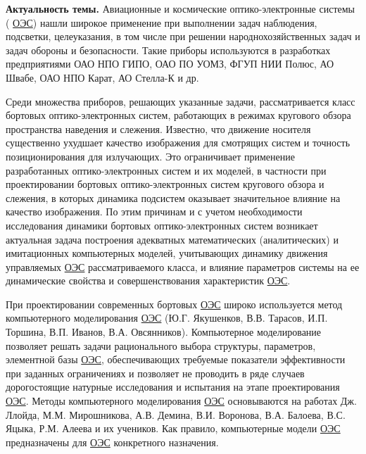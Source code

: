 
{\actuality} \textbf{Актуальность темы.} Авиационные и космические оптико-электронные системы ( \hyperref[acroEOS]{ОЭС}) нашли широкое применение при выполнении задач наблюдения, подсветки, целеуказания, в том числе при решении народнохозяйственных задач и задач обороны и безопасности. Такие приборы используются в разработках предприятиями ОАО НПО ГИПО, ОАО ПО УОМЗ, ФГУП НИИ Полюс, АО Швабе, ОАО НПО Карат, АО Стелла-К и др. 

Среди множества приборов, решающих указанные задачи, рассматривается класс бортовых оптико-электронных систем, работающих в режимах кругового обзора пространства наведения и слежения. Известно, что движение носителя существенно ухудшает качество изображения для смотрящих систем и точность позиционирования для излучающих. Это ограничивает применение разработанных оптико-электронных систем и их моделей, в частности при проектировании бортовых оптико-электронных систем кругового обзора и слежения, в которых динамика подсистем оказывает значительное влияние на качество изображения. По этим причинам и с учетом необходимости исследования динамики бортовых оптико-электронных систем возникает актуальная задача построения адекватных математических (аналитических) и имитационных компьютерных моделей, учитывающих динамику движения управляемых \hyperref[acroEOS]{ОЭС} рассматриваемого класса, и влияние параметров системы на ее динамические свойства и совершенствования характеристик \hyperref[acroEOS]{ОЭС}.

При проектировании современных бортовых  \hyperref[acroEOS]{ОЭС} широко используется метод компьютерного моделирования  \hyperref[acroEOS]{ОЭС} (Ю.Г. Якушенков, В.В. Тарасов, И.П. Торшина, В.П. Иванов, В.А. Овсянников). Компьютерное моделирование позволяет решать задачи рационального выбора структуры, параметров, элементной базы  \hyperref[acroEOS]{ОЭС}, обеспечивающих требуемые показатели эффективности при заданных ограничениях и позволяет не проводить в ряде случаев дорогостоящие натурные исследования и испытания на этапе проектирования  \hyperref[acroEOS]{ОЭС}. Методы компьютерного моделирования  \hyperref[acroEOS]{ОЭС} основываются на работах Дж. Ллойда, М.М. Мирошникова, А.В. Демина, В.И. Воронова, В.А. Балоева, В.С. Яцыка, Р.М.  Алеева и их учеников. Как правило, компьютерные модели  \hyperref[acroEOS]{ОЭС} предназначены для  \hyperref[acroEOS]{ОЭС} конкретного назначения. 

